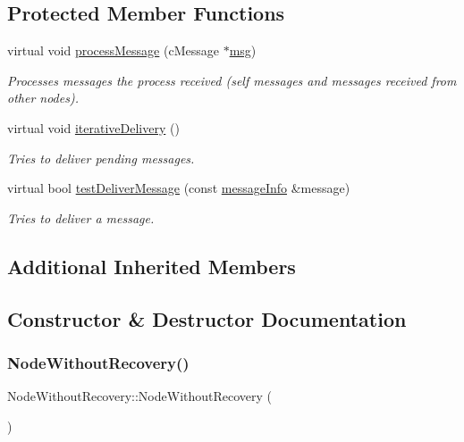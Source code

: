 \subsection*{Protected Member Functions}
\begin{DoxyCompactItemize}
\item 
virtual void \hyperlink{class_node_without_recovery_a0b44132b4ebc650399711766cb050399}{process\+Message} (c\+Message $\ast$\hyperlink{_controller_8h_afa0f3b802fbc219228f7bb97996fa558}{msg})
\begin{DoxyCompactList}\small\item\em Processes messages the process received (self messages and messages received from other nodes). \end{DoxyCompactList}\item 
virtual void \hyperlink{class_node_without_recovery_a65e21db6d6b4e72b898fd567f8b4aee2}{iterative\+Delivery} ()
\begin{DoxyCompactList}\small\item\em Tries to deliver pending messages. \end{DoxyCompactList}\item 
virtual bool \hyperlink{class_node_without_recovery_a8cf83ec6d0af26e385dcde0bc03f5b6d}{test\+Deliver\+Message} (const \hyperlink{structures_8h_a7e7bdc1d2fff8a9436f2f352b2711ed6}{message\+Info} \&message)
\begin{DoxyCompactList}\small\item\em Tries to deliver a message. \end{DoxyCompactList}\end{DoxyCompactItemize}
\subsection*{Additional Inherited Members}


\subsection{Constructor \& Destructor Documentation}
\mbox{\label{class_node_without_recovery_a81c3fab3d91ae3bd6496b876d16694d8}} 
\subsubsection{\texorpdfstring{Node\+Without\+Recovery()}{NodeWithoutRecovery()}}
{\footnotesize\ttfamily Node\+Without\+Recovery\+::\+Node\+Without\+Recovery (\begin{DoxyParamCaption}{ }\end{DoxyParamCaption})}

